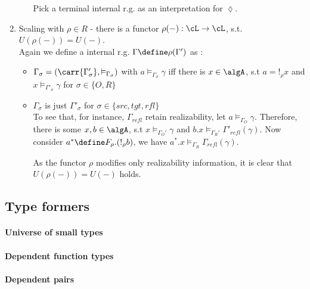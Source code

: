 \documentclass[12pt,a4paper]{article}
\def\rfl{_{refl}}\alwaysmath{rfl}
\renewcommand{\O}{_{O}}\alwaysmath{O}
\def\R{_{R}}\alwaysmath{R}
\begin{document}
\begin{enumerate}[noitemsep]
\begin{itemize}[noitemsep]
    Pick a terminal internal r.g. as an interpretation for $\lozenge$.
  \end{itemize}  
  \item Scaling with $\rho \in R$ - there is a functor $\rho(-) : \cL \to \cL$, s.t. $U(\rho(-)) = U(-)$.\\
  Again we define a internal r.g. $\Gamma \define \rho(\Gamma')$ as :
  \begin{itemize}
    \item $\Gamma_\sigma = (\carr{\Gamma'_\sigma}, \vDash_{\Gamma_\sigma})$ with $a \vDash_{\Gamma_\sigma} \gamma$ iff there is $x \in \algA$, s.t $a = !_\rho x$ and $x \vDash_{\Gamma'_\sigma} \gamma$ for $\sigma \in \{O, R\}$
    
    \item $\Gamma_\sigma$ is just $\Gamma'_\sigma$ for $\sigma\in\{src,tgt,rfl\}$ \\
    To see that, for instance, $\Gamma\rfl$ retain realizability, let $a \vDash_{\Gamma\O} \gamma$. Therefore, there is some $x, b \in \algA$, s.t $ x \vDash_{\Gamma\O'} \gamma$ and $b. x \vDash_{\Gamma\R'} \Gamma'\rfl(\gamma)$. Now consider $a^* \define F_\rho. (!_\rho b)$, we have $a^* . x \vDash_{\Gamma\R} \Gamma\rfl(\gamma)$.
    
    As the functor $\rho$ modifies only realizability information, it is clear that $U(\rho(-)) = U(-)$ holds.
    
  \end{itemize}
  
\end{enumerate}

\subsection*{Type formers}

\paragraph{Universe of small types}

\paragraph{Dependent function types}

\paragraph{Dependent pairs}
\end{document}
